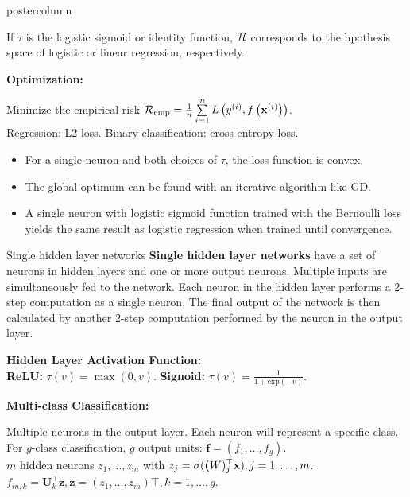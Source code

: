 \documentclass{beamer}
\begin{document}
\begin{frame}[fragile]{}
\begin{columns}
\begin{column}{.31\textwidth}
\begin{beamercolorbox}[center]{postercolumn}
\begin{minipage}{.98\textwidth}
{\begin{myblock}{ }
    If $\tau$ is the logistic sigmoid or identity function, $\mathcal{H}$ corresponds to the hpothesis space of logistic or linear regression, respectively.
    
    \begin{codebox} 
      \textbf{Optimization:}
      \end{codebox}
    Minimize the empirical risk $\mathcal{R}_{\text{emp}} = \frac{1}{n} \sum\limits_{i=1}^n L\left(y^{(i)}, f\left(\mathbf{x}^{(i)}\right)\right)$.\\
    Regression: L2 loss. Binary classification: cross-entropy loss.
    \begin{itemize}[$\bullet$] 
      \setlength{\itemindent}{+.3in}
        \item For a single neuron and both choices of $\tau$, the loss function is convex.
        \item The global optimum can be found with an iterative algorithm like GD.
        \item A single neuron with logistic sigmoid function trained with the Bernoulli loss yields the same result as logistic regression when trained until convergence.
    \end{itemize} 
  \end{myblock}

  \begin{myblock}{Single hidden layer networks}
  \textbf{Single hidden layer networks} have a set of neurons in hidden layers and one or more output neurons.
Multiple inputs are simultaneously fed to the network.
Each neuron in the hidden layer performs a 2-step computation as a single neuron.
The final output of the network is then calculated by another 2-step computation performed by the neuron in the output layer.

  \textbf{Hidden Layer Activation Function:}\\
  \textbf{ReLU:} $\tau(v) = \max(0,v)$. \textbf{Signoid:} $\tau(v) = \frac{1}{1+\text{exp}(-v)}$.

\begin{codebox}
  \textbf{Multi-class Classification:}
  \end{codebox}

Multiple neurons in the output layer.
Each neuron will represent a specific class.
For $g$-class classification, $g$ output units: $\bm{f}=(f_1,\ldots,f_g)$.\\
$m$ hidden neurons $z_1,\ldots, z_m$ with $z_j = \sigma(\bm(W)_j^\top\mathbf{x}), j=1,\ldots,m$.\\
$f_{in,k}=\bm{U}_k^\top\bm{z}, \bm{z}=(z_1,\ldots, z_m)\top, k=1,\ldots,g$.\\


\end{myblock}}
\end{minipage}
\end{beamercolorbox}
\end{column}
\end{columns}
\end{frame}
\end{document}
